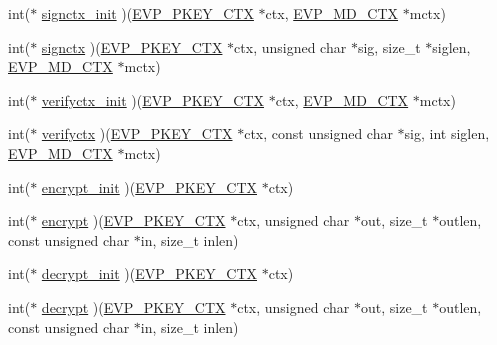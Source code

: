 \begin{DoxyCompactItemize}
int($\ast$ \hyperlink{structevp__pkey__method__st_a9fc3eed84c6c62be230843b0cf15f274}{signctx\+\_\+init} )(\hyperlink{crypto_2ossl__typ_8h_aaadbb75633e4460a52864970a3b875de}{E\+V\+P\+\_\+\+P\+K\+E\+Y\+\_\+\+C\+TX} $\ast$ctx, \hyperlink{crypto_2ossl__typ_8h_a69cda4d21bd068f01c469222c1dd92fe}{E\+V\+P\+\_\+\+M\+D\+\_\+\+C\+TX} $\ast$mctx)
\item 
int($\ast$ \hyperlink{structevp__pkey__method__st_a076e3385684612d4100af36fdf468f84}{signctx} )(\hyperlink{crypto_2ossl__typ_8h_aaadbb75633e4460a52864970a3b875de}{E\+V\+P\+\_\+\+P\+K\+E\+Y\+\_\+\+C\+TX} $\ast$ctx, unsigned char $\ast$sig, size\+\_\+t $\ast$siglen, \hyperlink{crypto_2ossl__typ_8h_a69cda4d21bd068f01c469222c1dd92fe}{E\+V\+P\+\_\+\+M\+D\+\_\+\+C\+TX} $\ast$mctx)
\item 
int($\ast$ \hyperlink{structevp__pkey__method__st_a277350e824db5ffd5a10273c8db72ffb}{verifyctx\+\_\+init} )(\hyperlink{crypto_2ossl__typ_8h_aaadbb75633e4460a52864970a3b875de}{E\+V\+P\+\_\+\+P\+K\+E\+Y\+\_\+\+C\+TX} $\ast$ctx, \hyperlink{crypto_2ossl__typ_8h_a69cda4d21bd068f01c469222c1dd92fe}{E\+V\+P\+\_\+\+M\+D\+\_\+\+C\+TX} $\ast$mctx)
\item 
int($\ast$ \hyperlink{structevp__pkey__method__st_a68e71568cd40f21082766ab049ebb382}{verifyctx} )(\hyperlink{crypto_2ossl__typ_8h_aaadbb75633e4460a52864970a3b875de}{E\+V\+P\+\_\+\+P\+K\+E\+Y\+\_\+\+C\+TX} $\ast$ctx, const unsigned char $\ast$sig, int siglen, \hyperlink{crypto_2ossl__typ_8h_a69cda4d21bd068f01c469222c1dd92fe}{E\+V\+P\+\_\+\+M\+D\+\_\+\+C\+TX} $\ast$mctx)
\item 
int($\ast$ \hyperlink{structevp__pkey__method__st_a8f5011cb6740b5370a11b80b4a929f88}{encrypt\+\_\+init} )(\hyperlink{crypto_2ossl__typ_8h_aaadbb75633e4460a52864970a3b875de}{E\+V\+P\+\_\+\+P\+K\+E\+Y\+\_\+\+C\+TX} $\ast$ctx)
\item 
int($\ast$ \hyperlink{structevp__pkey__method__st_a6f2eaf55e856641d4757261bc0750275}{encrypt} )(\hyperlink{crypto_2ossl__typ_8h_aaadbb75633e4460a52864970a3b875de}{E\+V\+P\+\_\+\+P\+K\+E\+Y\+\_\+\+C\+TX} $\ast$ctx, unsigned char $\ast$out, size\+\_\+t $\ast$outlen, const unsigned char $\ast$in, size\+\_\+t inlen)
\item 
int($\ast$ \hyperlink{structevp__pkey__method__st_a53fd999bdc6431dda7ad8c465600aec2}{decrypt\+\_\+init} )(\hyperlink{crypto_2ossl__typ_8h_aaadbb75633e4460a52864970a3b875de}{E\+V\+P\+\_\+\+P\+K\+E\+Y\+\_\+\+C\+TX} $\ast$ctx)
\item 
int($\ast$ \hyperlink{structevp__pkey__method__st_a7977b5b3c000c93ae4405b503061228f}{decrypt} )(\hyperlink{crypto_2ossl__typ_8h_aaadbb75633e4460a52864970a3b875de}{E\+V\+P\+\_\+\+P\+K\+E\+Y\+\_\+\+C\+TX} $\ast$ctx, unsigned char $\ast$out, size\+\_\+t $\ast$outlen, const unsigned char $\ast$in, size\+\_\+t inlen)

\end{DoxyCompactItemize}

